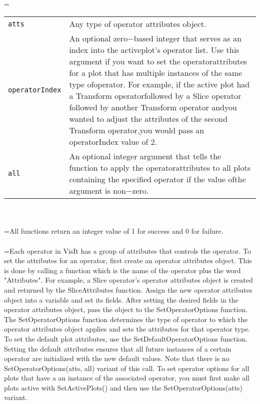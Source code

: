 \documentclass[10pt,a4paper]{report}
\begin{document}
 \\ 
\hangindent=\parindent 
\begin{tabular}{lp{9cm}}
\verb!atts! & Any type of operator attributes object. \\
\verb!operatorIndex! & An optional zero$-$based integer that serves as an index into the activeplot's operator list. Use this argument if you want to set the operatorattributes for a plot that has multiple instances of the same type ofoperator. For example, if the active plot had a Transform operatorfollowed by a Slice operator followed by another Transform operator andyou wanted to adjust the attributes of the second Transform operator,you would pass an operatorIndex value of 2. \\
\verb!all! & An optional integer argument that tells the function to apply the operatorattributes to all plots containing the specified operator if the value ofthe argument is non$-$zero. \\
\end{tabular} \\[-2mm]


 \\ 
\hangindent=\parindent All functions return an integer value of 1 for success and 0 for failure. \\[-3mm] 

 \\ 
\hangindent=\parindent Each operator in VisIt has a group of attributes that controls the operator. To set the attributes for an operator, first create an operator attributes object. This is done by calling a function which is the name of the operator plus the word "Attributes". For example, a Slice operator's operator attributes object is created and returned by the SliceAttributes function. Assign the new operator attributes object into a variable and set its fields. After setting the desired fields in the operator attributes object, pass the object to the SetOperatorOptions function. The SetOperatorOptions function determines the type of operator to which the operator attributes object applies and sets the attributes for that operator type. To set the default plot attributes, use the SetDefaultOperatorOptions function. Setting the default attributes ensures that all future instances of a certain operator are initialized with the new default values. Note that there is no SetOperatorOptions(atts, all) variant of this call. To set operator options for all plots that have a an instance of the associated operator, you must first make all plots active with SetActivePlots() and then use the SetOperatorOptions(atts) variant. \\[-3mm] 
\end{document}
